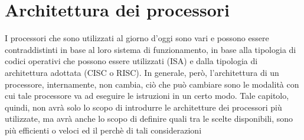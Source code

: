\chapter{Architettura dei processori}
I processori che sono utilizzati al giorno d'oggi sono vari e possono essere contraddistinti in base al loro sistema di funzionamento, in base alla tipologia di codici operativi che possono essere utilizzati (ISA) e dalla tipologia di architettura adottata (CISC o RISC). 
In generale, però, l'architettura di un processore, internamente, non cambia, ciò che può cambiare sono le modalità con cui tale processore va ad eseguire le istruzioni in un certo modo. Tale capitolo, quindi, non avrà solo lo scopo di introdurre le architetture dei processori più utilizzate, ma avrà anche lo scopo di definire quali tra le scelte disponibili, sono più efficienti o veloci ed il perchè di tali considerazioni


